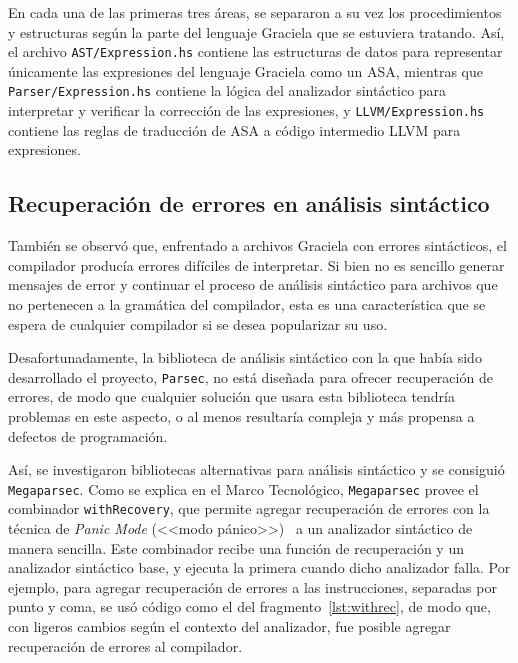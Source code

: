 En cada una de las primeras tres áreas, se separaron a su vez los procedimientos
y estructuras según la parte del lenguaje Graciela que se estuviera tratando.
Así, el archivo \texttt{AST/Expression.hs} contiene las estructuras de datos
para representar únicamente las expresiones del lenguaje Graciela como un
\textsc{ASA}, mientras que \texttt{Parser/Expression.hs} contiene la lógica del
analizador sintáctico para interpretar y verificar la corrección de las
expresiones, y \texttt{LLVM/Expression.hs} contiene las reglas de traducción de
\textsc{ASA} a código intermedio \textsc{LLVM} para expresiones.

\subsection{Recuperación de errores en análisis sintáctico}

También se observó que, enfrentado a archivos Graciela con errores sintácticos,
el compilador producía errores difíciles de interpretar. Si bien no es sencillo
generar mensajes de error y continuar el proceso de análisis sintáctico para
archivos que no pertenecen a la gramática del compilador, esta es una
característica que se espera de cualquier compilador si se desea popularizar su
uso.

Desafortunadamente, la biblioteca de análisis sintáctico con la que había sido
desarrollado el proyecto, \texttt{Parsec}, no está diseñada para ofrecer
recuperación de errores, de modo que cualquier solución que usara esta
biblioteca tendría problemas en este aspecto, o al menos resultaría compleja y
más propensa a defectos de programación.

Así, se investigaron bibliotecas alternativas para análisis sintáctico y se
consiguió \texttt{Megaparsec}. Como se explica en el Marco Tecnológico,
\texttt{Megaparsec} provee el combinador \texttt{withRecovery}, que permite
agregar recuperación de errores con la técnica de \textit{Panic Mode} (<<modo
pánico>>)~\cite{aho2} a un analizador sintáctico de manera sencilla. Este
combinador recibe una función de recuperación y un analizador sintáctico base, y
ejecuta la primera cuando dicho analizador falla. Por ejemplo, para agregar
recuperación de errores a las instrucciones, separadas por punto y coma, se usó
código como el del fragmento~\ref{lst:withrec}, de modo que, con ligeros cambios
según el contexto del analizador, fue posible agregar recuperación de errores al
compilador.

